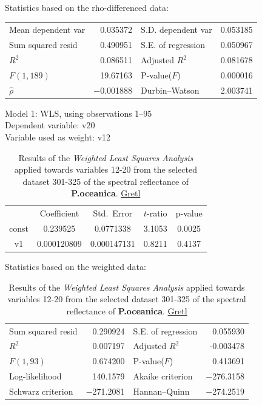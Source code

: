 \documentclass[10pt, a4paper]{article}
\begin{document}
\begin{appendices}
\begin{table}[H]
\begin{center}
	\vspace{1em}Statistics based on the rho-differenced data:

	\vspace{1ex}
	\begin{tabular}{lrlr}
		Mean dependent var &  0.035372 & S.D. dependent var &  0.053185 \\
		Sum squared resid &  0.490951 & S.E. of regression &  0.050967 \\
		$R^2$ &  0.086511 & Adjusted $R^2$ &  0.081678 \\
		$F(1, 189)$ &  19.67163 & P-value($F$) &  0.000016 \\
		$\hat{\rho}$ & $-$0.001888 & Durbin--Watson &  2.003741 \\
	\end{tabular}
	\end{center}
\end{table}

\begin{table}[H]
	\begin{center}
	\caption{Results of the \textit{Weighted Least Squares Analysis} applied towards variables 12-20 from the selected dataset 301-325 of the spectral reflectance of \textbf{P.oceanica}. \href{http://gretl.sourceforge.net/}{Gretl}}
		Model 1: WLS, using observations 1--95\\
		Dependent variable: v20\\
		Variable used as weight: v12

	\vspace{1em}
	\begin{tabular}{|c|c|c|c|c|}
		  & {Coefficient} & {Std.\ Error} & {$t$-ratio} & {p-value} \\[1ex]
		const &   0.239525 &     0.0771338 & 3.1053 &         0.0025 \\
		v1 &   0.000120809 &     0.000147131 &       0.8211 &         0.4137 \\
	\end{tabular}

	\vspace{1em}Statistics based on the weighted data:

	\vspace{1ex}
	\begin{tabular}{lrlr}
		Sum squared resid &  0.290924 & S.E. of regression &  0.055930 \\
		$R^2$ &  0.007197 & Adjusted $R^2$ & -0.003478 \\
		$F(1, 93)$ &  0.674200 & P-value($F$) &  0.413691 \\
		Log-likelihood &  140.1579 & Akaike criterion & $-$276.3158 \\
		Schwarz criterion & $-$271.2081 & Hannan--Quinn & $-$274.2519 \\
	\end{tabular}


\end{center}
\end{table}
\end{appendices}
\end{document}
